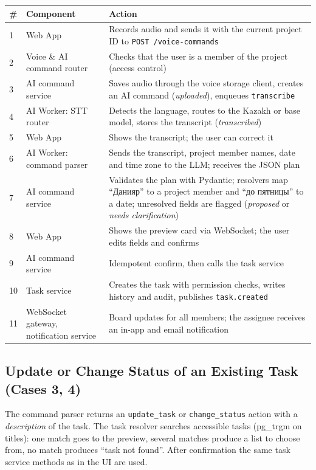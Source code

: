 \documentclass[11pt,a4paper]{article}
\newcommand{\tblstart}{\small\rowcolors{2}{gray!7}{white}}
\newcommand{\code}[1]{\texttt{#1}}
\begin{document}
{\tblstart
\begin{xltabular}{\textwidth}{P{0.6cm} P{3.2cm} L}
\toprule
\textbf{\#} & \textbf{Component} & \textbf{Action} \\
\midrule
{} & Web App & Records audio and sends it with the current project ID to \code{POST /voice-commands} \\
2 & Voice \& AI command router & Checks that the user is a member of the project (access control) \\
3 & AI command service & Saves audio through the voice storage client, creates an AI command (\textit{uploaded}), enqueues \code{transcribe} \\
4 & AI Worker: STT router & Detects the language, routes to the Kazakh or base model, stores the transcript (\textit{transcribed}) \\
5 & Web App & Shows the transcript; the user can correct it \\
6 & AI Worker: command parser & Sends the transcript, project member names, date and time zone to the LLM; receives the JSON plan \\
7 & AI command service & Validates the plan with Pydantic; resolvers map ``Данияр'' to a project member and ``до пятницы'' to a date; unresolved fields are flagged (\textit{proposed} or \textit{needs clarification}) \\
8 & Web App & Shows the preview card via WebSocket; the user edits fields and confirms \\
9 & AI command service & Idempotent confirm, then calls the task service \\
10 & Task service & Creates the task with permission checks, writes history and audit, publishes \code{task.created} \\
11 & WebSocket gateway, notification service & Board updates for all members; the assignee receives an in-app and email notification \\
\bottomrule
\end{xltabular}}

\subsection{Update or Change Status of an Existing Task (Cases 3, 4)}

The command parser returns an \code{update\_task} or \code{change\_status} action with a \textit{description} of the task. The task resolver searches accessible tasks (pg\_trgm on titles): one match goes to the preview, several matches produce a list to choose from, no match produces ``task not found''. After confirmation the same task service methods as in the UI are used.
\end{document}
